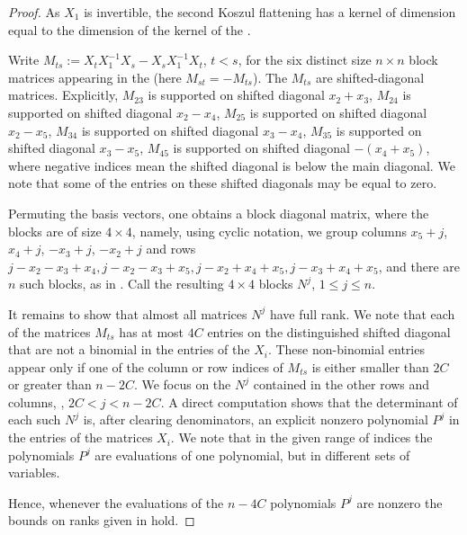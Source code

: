 \documentclass{toc}
\begin{document}
\begin{proof}
As $X_1$ is invertible, the second Koszul flattening 
has a kernel of dimension equal to the dimension of the kernel  of
the .  %

Write $M_{ts}:=X_tX_1^{-1} X_s-X_sX_1^{-1}X_t$, $t<s$, for the six  distinct  size $n\times n$
block matrices appearing in
the  %
(here $M_{st}=-M_{ts}$). 
The $M_{ts}$   are 
%
 shifted-diagonal
matrices. Explicitly, $M_{23}$ is supported on 
%
 shifted diagonal $x_2+x_3$,
$M_{24}$ is supported on 
%
 shifted diagonal $x_2-x_4$, $M_{25}$ is supported on   %
 shifted  
 diagonal $x_2-x_5$,
$M_{34}$ is supported on 
%
 shifted 
 diagonal $x_3-x_4$, $M_{35}$ is supported on 
 shifted 
 diagonal $x_3-x_5$,
$M_{45}$ is supported on 
%
 shifted
 diagonal $-(x_4+x_5)$,
where negative indices mean the 
%
shifted 
diagonal is below the main diagonal. We note that some of the entries on these 
%
 shifted
 diagonals may be equal to zero.

Permuting the basis vectors, one obtains a  block diagonal matrix, where the blocks are
of size $4\times 4$, namely, using cyclic notation, we group columns
$x_5+j$, $x_4+j$, $-x_3+j$, $-x_2+j$
and rows $j-x_2-x_3+x_4,j-x_2-x_3+x_5,j-x_2+x_4+x_5,j-x_3+x_4+x_5$, and there are $n$ such blocks, as in .
Call the resulting $4\times 4$  blocks $N^j$, $1\leq j\leq n$.

It remains to show
that  %
almost all matrices $N^j$ have full rank. We note that each of the matrices $M_{ts}$ has at most $4C$ entries on the distinguished 
%
shifted 
diagonal that are not a binomial in the entries of %
the $X_i$.  %
These non-binomial entries appear only if one of the column or row indices of $M_{ts}$ is either smaller than $2C$ or greater than $n-2C$. We focus on 
%
the $N^j$   %
%
contained in the other rows and columns, \ie, $2C<j<n-2C$. A direct computation shows that the determinant of each such $N^j$ is, after clearing denominators, an explicit nonzero polynomial $P^j$ in the entries of the matrices $X_i$. We note that in the given range of indices the polynomials $P^j$ are evaluations of one polynomial, but in different sets of variables.

Hence, whenever the evaluations of the $n-4C$  polynomials $P^j$ are nonzero
the bounds on ranks given in  hold.  
\end{proof}
\end{document}
